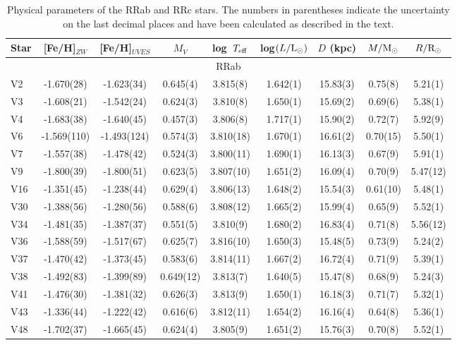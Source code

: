 \documentclass[journal]{rmaa}
\newcommand{\1}{\'{\i}}
\def\RRab{RRab }
\def\RRc{RRc }
\begin{document}
\begin{table*}
\footnotesize
\begin{center}
\caption[] {\small Physical parameters of the \RRab and \RRc stars. The
numbers in parentheses indicate the uncertainty on the last
decimal places and have been calculated as described in the text.}
\label{fisicos}
 \begin{tabular}{lcccccccc}
\hline
Star&[Fe/H]$_{ZW}$ & [Fe/H]$_{UVES}$ &$M_V$ & log~$T_{\rm eff}$  &log$(L/{\rm
L_{\odot}})$ &$D$ (kpc)&
$M/{\rm M_{\odot}}$&$R/{\rm R_{\odot}}$\\
\hline
\multicolumn{9}{c}{RRab} \\
\hline
V2&-1.670(28)& -1.623(34)&  0.645(4)&  3.815(8)&  1.642(1)& 15.83(3)& 0.75(8)&
5.21(1)\\
V3&-1.608(21)& -1.542(24)&  0.624(3)&  3.810(8)&  1.650(1)& 15.69(2)& 0.69(6)&
5.38(1)\\
V4&-1.683(38)& -1.640(45)&  0.457(3)&  3.806(8)&  1.717(1)& 15.90(2)& 0.72(7)&
5.92(9)\\
V6&-1.569(110)& -1.493(124)& 0.574(3)&  3.810(18)& 1.670(1)& 16.61(2)& 0.70(15)&
5.50(1)\\
V7&-1.557(38)& -1.478(42)&  0.524(3)&  3.800(11)&  1.690(1)& 16.13(3)& 0.67(9)&
5.91(1)\\
V9&-1.800(39)& -1.800(51)&  0.623(5)&  3.807(10)&  1.651(2)& 16.09(4)& 0.70(9)&
5.47(12)\\
V16&-1.351(45)& -1.238(44)&  0.629(4)&  3.806(13)&  1.648(2)& 15.54(3)& 0.61(10)&
5.48(1)\\
V30&-1.388(56)& -1.280(56)&  0.588(6)&  3.808(12)&  1.665(2)& 15.99(4)& 0.65(9)&
5.52(1)\\
V34&-1.481(35)& -1.387(37)&  0.551(5)&  3.810(9)&  1.680(2)& 16.83(4)& 0.71(8)&
5.56(12)\\
V36&-1.588(59)& -1.517(67)&  0.625(7)&  3.816(10)& 1.650(3)& 15.48(5)& 0.73(9)&
5.24(2)\\
V37&-1.470(42)& -1.373(45)& 0.583(6)&  3.814(11)&  1.667(2)& 16.72(4)& 0.71(9)&
5.39(1)\\
V38&-1.492(83)& -1.399(89)&  0.649(12)&  3.813(7)&  1.640(5)& 15.47(8)& 0.68(9)&
5.24(3)\\
V41&-1.476(30)& -1.381(32)&  0.626(3)&  3.813(9)&  1.650(1)& 16.18(3)& 0.71(7)&
5.32(1)\\
V43&-1.336(44)& -1.222(42)&  0.616(6)&  3.812(11)&  1.654(2)& 16.16(4)& 0.64(8)&
5.36(1)\\
V48&-1.702(37)& -1.665(45)&  0.624(4)&  3.805(9)&  1.651(2)& 15.76(3)&  0.70(8)&
5.52(1)\\

\end{tabular}
\end{center}
\end{table*}
\end{document}
